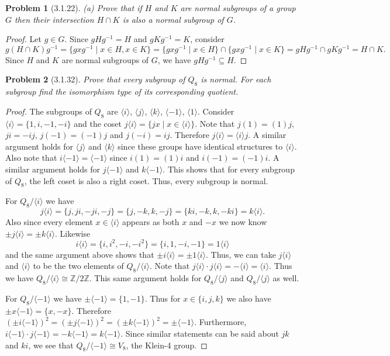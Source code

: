 \documentclass{article}
\newtheorem{problem}{Problem}
\begin{document}
\begin{problem}[3.1.22]
(a) Prove that if $H$ and $K$ are normal subgroups of a group $G$ then their intersection $H \cap K$ is also a normal subgroup of $G$.
\end{problem}
\begin{proof}
Let $g \in G$. Since $gHg^{-1} = H$ and $gKg^{-1} = K$, consider
\[
g(H \cap K)g^{-1} = \{gxg^{-1} \mid x \in H, x \in K\} = \{gxg^{-1} \mid x \in H\} \cap \{gxg^{-1} \mid x \in K\} = gHg^{-1} \cap gKg^{-1} = H \cap K.
\]
Since $H$ and $K$ are normal subgroups of $G$, we have $gHg^{-1} \subseteq H$.
\end{proof}

\begin{problem}[3.1.32]
\label{q8normalsubgroups}
Prove that every subgroup of $Q_8$ is normal. For each subgroup find the isomorphism type of its corresponding quotient.
\end{problem}
\begin{proof}
The subgroups of $Q_8$ are $\langle i \rangle$, $\langle j \rangle$, $\langle k \rangle$, $\langle -1 \rangle$, $\langle 1 \rangle$. Consider $\langle i \rangle = \{1, i, -1, -i\}$ and the coset $j\langle i \rangle = \{jx \mid x \in \langle i \rangle\}$. Note that $j(1) = (1)j$, $ji = -ij$, $j(-1) = (-1)j$ and $j(-i) = ij$. Therefore $j \langle i \rangle = \langle i \rangle j$. A similar argument holds for $\langle j \rangle$ and $\langle k \rangle$ since these groups have identical structures to $\langle i \rangle$. Also note that $i \langle -1 \rangle = \langle -1 \rangle$ since $i(1) = (1)i$ and $i(-1) = (-1)i$. A similar argument holds for $j \langle -1 \rangle$ and $k \langle -1 \rangle$. This shows that for every subgroup of $Q_8$, the left coset is also a right coset. Thus, every subgroup is normal.

For $Q_8/\langle i \rangle$ we have
\[
j\langle i \rangle = \{j, ji, -ji, -j\} = \{j, -k, k, -j\} = \{ki, -k, k, -ki\} = k\langle i \rangle.
\]
Also since every element $x \in \langle i \rangle$ appears as both $x$ and $-x$ we now know $\pm j \langle i \rangle = \pm k \langle i \rangle$. Likewise
\[
i \langle i \rangle = \{i, i^2, -i, -i^2\} = \{i, 1, -i, -1\} = 1\langle i \rangle
\]
and the same argument above shows that $\pm i \langle i \rangle = \pm 1 \langle i \rangle$. Thus, we can take $j\langle i \rangle$ and $\langle i \rangle$ to be the two elements of $Q_8/\langle i \rangle$. Note that $j\langle i \rangle \cdot j \langle i \rangle = -\langle i \rangle = \langle i \rangle$. Thus we have $Q_8/\langle i \rangle \cong \mathbb{Z}/2\mathbb{Z}$. This same argument holds for $Q_8/\langle j \rangle$ and $Q_8/\langle j \rangle$ as well.

For $Q_8/\langle -1 \rangle$ we have $\pm \langle -1 \rangle = \{1, -1\}$. Thus for $x \in \{i, j, k\}$ we also have $\pm x \langle -1 \rangle = \{x, -x\}$. Therefore $(\pm i\langle -1 \rangle)^2 = (\pm j\langle -1 \rangle)^2 = (\pm k\langle -1 \rangle)^2 = \pm \langle -1 \rangle$. Furthermore, $i\langle -1 \rangle \cdot j \langle -1 \rangle = -k \langle -1 \rangle = k \langle -1 \rangle$. Since similar statements can be said about $jk$ and $ki$, we see that $Q_8/\langle -1 \rangle \cong V_8$, the Klein-4 group.
\end{proof}
\end{document}
